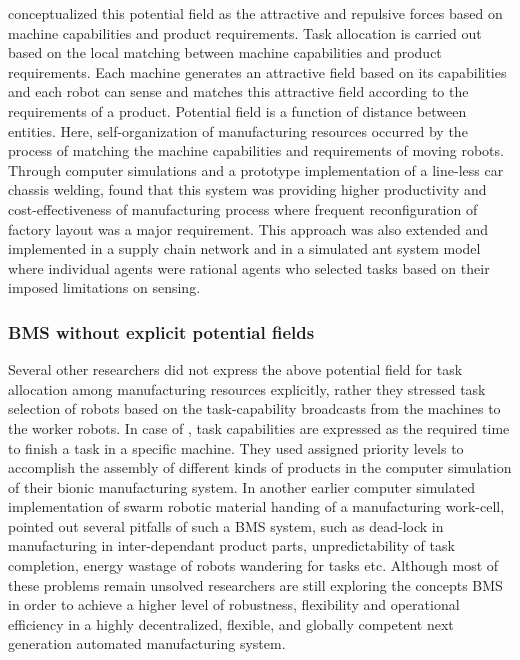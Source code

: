  conceptualized this potential field as the attractive and repulsive forces based on machine capabilities and product requirements. Task allocation is carried out based on the local matching between machine capabilities and product requirements. Each machine generates an attractive field based on its capabilities and each robot can sense and matches this attractive field according to the requirements of a product. Potential field is a function of distance between entities. Here, self-organization of manufacturing resources occurred by the process of matching the machine capabilities and requirements of moving robots. Through computer simulations and a prototype implementation of a line-less car chassis welding,  found that this system was providing higher productivity and cost-effectiveness of manufacturing process where frequent reconfiguration of factory layout was a major requirement. This approach was also extended and implemented in a supply chain network and in a simulated ant system model where individual agents were rational agents who selected tasks based on their imposed limitations on sensing.
\subsubsection*{BMS without explicit potential fields}
Several other researchers did not express the above potential field for task allocation among manufacturing resources explicitly, rather they stressed task selection of robots based on the task-capability broadcasts from the machines to the worker robots. In case of , task capabilities are expressed as the required time to finish a task in a specific machine. They used assigned priority levels to accomplish the assembly of different kinds of products in the computer simulation of their bionic manufacturing system. In another earlier computer simulated implementation of swarm robotic material handing of a manufacturing work-cell,  pointed out several pitfalls of such a BMS system, such as dead-lock in manufacturing in inter-dependant product parts, unpredictability of task completion, energy wastage of robots wandering for tasks etc. Although most of these problems remain unsolved researchers are still exploring the concepts BMS in order to achieve a higher level of robustness, flexibility and operational efficiency in a highly decentralized, flexible, and globally competent next generation automated manufacturing system.

